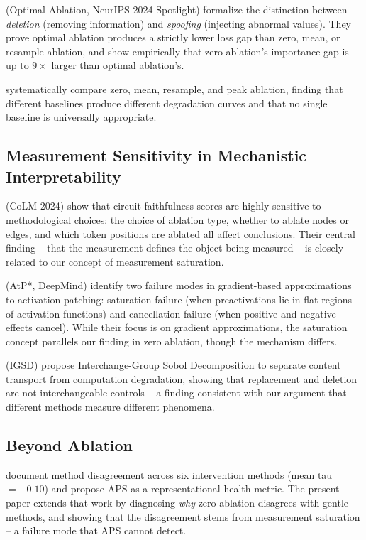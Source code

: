 \documentclass[pdflatex,sn-mathphys-num]{sn-jnl}
\begin{document}
\citet{LiJanson2024} (Optimal Ablation, NeurIPS 2024 Spotlight) formalize the distinction between \emph{deletion} (removing information) and \emph{spoofing} (injecting abnormal values). They prove optimal ablation produces a strictly lower loss gap than zero, mean, or resample ablation, and show empirically that zero ablation's importance gap is up to $9\times$ larger than optimal ablation's.

\citet{Pochinkov2024} systematically compare zero, mean, resample, and peak ablation, finding that different baselines produce different degradation curves and that no single baseline is universally appropriate.

\subsection{Measurement Sensitivity in Mechanistic Interpretability}

\citet{Miller2024} (CoLM 2024) show that circuit faithfulness scores are highly sensitive to methodological choices: the choice of ablation type, whether to ablate nodes or edges, and which token positions are ablated all affect conclusions. Their central finding -- that the measurement defines the object being measured -- is closely related to our concept of measurement saturation.

\citet{Kramar2024} (AtP*, DeepMind) identify two failure modes in gradient-based approximations to activation patching: saturation failure (when preactivations lie in flat regions of activation functions) and cancellation failure (when positive and negative effects cancel). While their focus is on gradient approximations, the saturation concept parallels our finding in zero ablation, though the mechanism differs.

\citet{Guo2026} (IGSD) propose Interchange-Group Sobol Decomposition to separate content transport from computation degradation, showing that replacement and deletion are not interchangeable controls -- a finding consistent with our argument that different methods measure different phenomena.

\subsection{Beyond Ablation}

\citet{Liu2025} document method disagreement across six intervention methods (mean tau $=-0.10$) and propose APS as a representational health metric. The present paper extends that work by diagnosing \emph{why} zero ablation disagrees with gentle methods, and showing that the disagreement stems from measurement saturation -- a failure mode that APS cannot detect.
\end{document}

